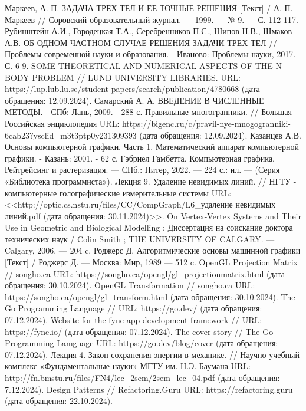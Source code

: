 \begin{thebibliography}{}
	 Маркеев, А. П. ЗАДАЧА ТРЕХ ТЕЛ И ЕЕ ТОЧНЫЕ РЕШЕНИЯ [Текст] / А. П. Маркеев // Соровский образовательный журнал. — 1999. — № 9. — С. 112-117.
	 Рубинштейн А.И., Городецкая Т.А., Серебренников П.С., Шипов Н.В., Шмаков А.В. ОБ ОДНОМ ЧАСТНОМ СЛУЧАЕ РЕШЕНИЯ ЗАДАЧИ ТРЕХ ТЕЛ // Проблемы современной науки и образования. - Иваново: Проблемы науки, 2017. - С. 6-9.
	 SOME THEORETICAL AND NUMERICAL ASPECTS OF THE N-BODY PROBLEM // LUND UNIVERSITY LIBRARIES. URL: https://lup.lub.lu.se/student-papers/search/publication/4780668 (дата обращения: 12.09.2024).
	 Самарский А. А. ВВЕДЕНИЕ В ЧИСЛЕННЫЕ МЕТОДЫ. - СПб: Лань, 2009. - 288 с.
	 Правильные многогранники. // Большая Российская энциклопедия URL: https://bigenc.ru/c/pravil-nye-mnogogranniki-6cab23?ysclid=m3t3ptp0y231309393 (дата обращения: 12.09.2024).
	 Казанцев А.В. Основы компьютерной графики. Часть 1. Математический аппарат компьютерной графики. - Казань: 2001. - 62 с.
	 Гэбриел Гамбетта. Компьютерная графика. Рейтрейсинг и растеризация. — СПб.: Питер, 2022. — 224 с.: ил. — (Серия «Библиотека программиста»).
	 Лекция 9. Удаление невидимых линий. // НГТУ - компьютерные голографические измерительные системы URL: <<http://optic.cs.nstu.ru/files/CC/CompGraph/L6\_удаление невидимых линий.pdf (дата обращения: 30.11.2024)>>.
	 On Vertex-Vertex Systems and Their Use in Geometric and Biological Modelling : Диссертация на соискание доктора технических наук / Colin Smith ; THE UNIVERSITY OF CALGARY. — Calgary, 2006. — 204 c.
	 Роджерс Д. Алгоритмические основы машинной графики [Текст] / Роджерс Д. — Москва: Мир, 1989 — 512 c.
	 OpenGL Projection Matrix // songho.ca URL: https://songho.ca/opengl/gl\_projectionmatrix.html (дата обращения: 30.10.2024).
	 OpenGL Transformation // songho.ca URL: https://songho.ca/opengl/gl\_transform.html (дата обращения: 30.10.2024).
	 The Go Programming Language // URL: https://go.dev/ (дата обращения: 07.12.2024).
	 Website for the fyne app development framework // URL: https://fyne.io/ (дата обращения: 07.12.2024).
	 The cover story // The Go Programming Lamguage URL: https://go.dev/blog/cover (дата обращения: 07.12.2024).
	 Лекция 4. Закон сохранения энергии в механике. // Научно-учебный комплекс «Фундаментальные науки» МГТУ им. Н.Э. Баумана URL: http://fn.bmstu.ru/files/FN4/lec\_2sem/2sem\_lec\_04.pdf (дата обращения: 7.12.2024).
	 Design Patterns // Refactoring.Guru URL: https://refactoring.guru (дата обращения: 22.10.2024).
\end{thebibliography}
